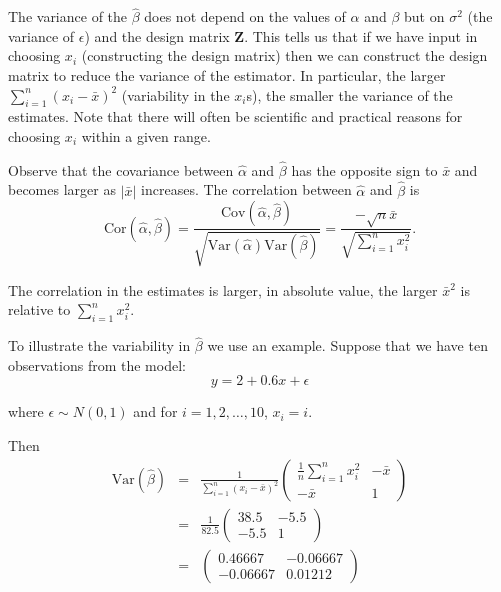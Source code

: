 \documentclass[
]{book}
\begin{document}
The variance of the \(\hat{\beta}\) does not depend on the values of \(\alpha\) and \(\beta\) but on \(\sigma^2\) (the variance of \(\epsilon\)) and the design matrix \(\mathbf{Z}\). This tells us that if we have input in choosing \(x_i\) (constructing the design matrix) then we can construct the design matrix to reduce the variance of the estimator. In particular, the larger \(\sum_{i=1}^n (x_i - \bar{x})^2\) (variability in the \(x_i\)s), the smaller the variance of the estimates. Note that there will often be scientific and practical reasons for choosing \(x_i\) within a given range.

Observe that the covariance between \(\hat{\alpha}\) and \(\hat{\beta}\) has the opposite sign to \(\bar{x}\) and becomes larger as \(|\bar{x}|\) increases. The correlation between \(\hat{\alpha}\) and \(\hat{\beta}\) is\\

\[ \text{Cor} (\hat{\alpha},\hat{\beta}) = \frac{\text{Cov}(\hat{\alpha},\hat{\beta})}{\sqrt{\text{Var}(\hat{\alpha}) \text{Var}(\hat{\beta})}}
=  \frac{- \sqrt{n} \bar{x}}{\sqrt{\sum_{i=1}^n x_i^2}}. \]

The correlation in the estimates is larger, in absolute value, the larger \(\bar{x}^2\) is relative to \(\sum_{i=1}^n x_i^2\).

To illustrate the variability in \(\hat{\beta}\) we use an example. Suppose that we have ten observations from the model:\\

\[ y = 2 + 0.6 x + \epsilon \]

where \(\epsilon \sim N(0,1)\) and for \(i=1,2,\ldots, 10\), \(x_i =i\).

Then\\

\begin{eqnarray*} \text{Var} (\hat{\beta}) &=& \frac{1}{\sum_{i=1}^n (x_i -\bar{x})^2} \begin{pmatrix} \frac{1}{n} \sum_{i=1}^n x_i^2 & - \bar{x} \\ -\bar{x} & 1 
\end{pmatrix} \\ &=& \frac{1}{82.5}  \begin{pmatrix} 38.5 & - 5.5 \\ -5.5 & 1 
\end{pmatrix}\\  &=&  \begin{pmatrix} 0.46667 & -0.06667 \\ -0.06667 & 0.01212 
\end{pmatrix}
\end{eqnarray*}
\end{document}
